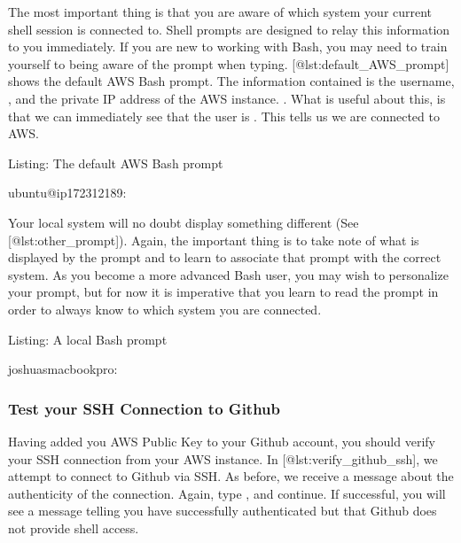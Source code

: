 \documentclass[letterpaper,10pt,english]{sphinxmanual}
\begin{document}
The most important thing is that you are aware of which system your
current shell session is connected to. Shell prompts are designed to
relay this information to you immediately. If you are new to working
with Bash, you may need to train yourself to being aware of the prompt
when typing. {[}@lst:default\_AWS\_prompt{]} shows the default AWS Bash
prompt. The information contained is the username, , and the
private IP address of the AWS instance. . What is useful about this, is that we can
immediately see that the user is . This tells us we are
connected to AWS.

Listing: The default AWS Bash prompt

%
\begin{sphinxVerbatim}[commandchars=\\\{\}]
ubuntu@ip\PYGZhy{}172\PYGZhy{}31\PYGZhy{}21\PYGZhy{}89:\PYGZti{}\PYGZdl{}
\end{sphinxVerbatim}

Your local system will no doubt display something different (See
{[}@lst:other\_prompt{]}). Again, the important thing is to take note of
what is displayed by the prompt and to learn to associate that prompt
with the correct system. As you become a more advanced Bash user, you
may wish to personalize your prompt, but for now it is imperative that
you learn to read the prompt in order to always know to which system you
are connected.

Listing: A local Bash prompt

%
\begin{sphinxVerbatim}[commandchars=\\\{\}]
joshuas\PYGZhy{}macbook\PYGZhy{}pro:\PYGZti{}\PYGZdl{}
\end{sphinxVerbatim}


\subsubsection{Test your SSH Connection to Github}
\label{\detokenize{02-elastic-compute-cloud:Test-your-SSH-Connection-to-Github}}
Having added you AWS Public Key to your Github account, you should
verify your SSH connection from your AWS instance. In
{[}@lst:verify\_github\_ssh{]}, we attempt to connect to Github via SSH. As
before, we receive a message about the authenticity of the connection.
Again, type , and continue. If successful, you will see a message
telling you have successfully authenticated but that Github does not
provide shell access.
\end{document}

